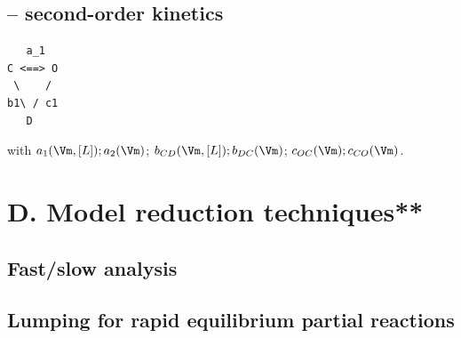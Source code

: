 \subsection{-- second-order kinetics}

\begin{verbatim}
   a_1
C <==> O
 \    /
b1\ / c1
   D
\end{verbatim}
with $a_1(\Vm,[L]); a_2(\Vm)$; $b_{CD}(\Vm,[L]); b_{DC}(\Vm)$;
$c_{OC}(\Vm); c_{CO}(\Vm)$.

\section{D. Model reduction techniques**}
\label{sec:model-reduct-techn}

\subsection{Fast/slow analysis}
\label{sec:fastslow-analysis}


\subsection{Lumping for rapid equilibrium partial reactions}
\label{sec:lump-rapid-equil}

